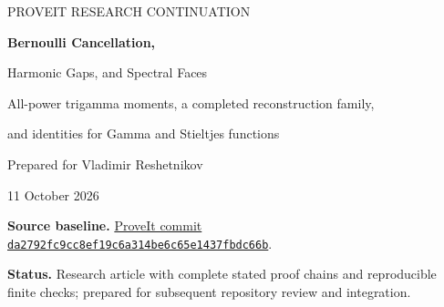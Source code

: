 \documentclass[11pt,a4paper]{article}
\begin{document}
\hypersetup{pageanchor=false}
\begin{titlepage}
\vspace*{15mm}
{\sffamily\color{ResearchBlue}\large PROVEIT RESEARCH CONTINUATION\par}
\vspace{12mm}
{\LARGE\bfseries Bernoulli Cancellation,\par
Harmonic Gaps, and Spectral Faces\par}
\vspace{7mm}
{\large All-power trigamma moments, a completed reconstruction family,\par
and identities for Gamma and Stieltjes functions\par}
\vspace{13mm}
{\large Prepared for Vladimir Reshetnikov\par}
\vspace{3mm}
{11 October 2026\par}
\vspace{13mm}
\begin{abstract}
We continue several precise research questions in the ProveIt manuscript
and its five incoming reports of 11 October 2026. A single Bernoulli
polynomial identity cancels the finite-cutoff boundary terms for every
power of the trigamma tail. It gives an anchored analytic generator,
a finite multiple-zeta coordinate space at each power, a uniform
extension to all repeated even-order Hurwitz tails, and explicit
fifth- and sixth-power ordinary convergent sums. We determine all Laurent
coefficients on the complementary resonant lattice, including the exact
local convergence radius and Stieltjes normalization. A separate exact
certificate at the previously uncovered index completes the
smaller-order-ten optimal-prefix reconstruction family. For relative
multiple-Hurwitz interpolants we prove closure under finite decorations
and obtain several-marker identities involving log-Gamma products and
normalized Stieltjes primitives. Finally, an explicit subtraction on
every face of a Dirichlet simplex expresses all higher spectral defects
through lower one-mass derivatives; the full zero-jet correction is a
finite rational function and vanishes for mean-zero periodic weights.
Proofs, exact algebraic certificates, numerical diagnostics, a source
audit, and precise further questions are supplied. Statements of rank
refer to specified rational coordinate systems; no numerical period
independence or unproved Gaussian ladder identity is asserted.
\end{abstract}
\vfill
\noindent\textbf{Source baseline.}
\href{https://github.com/VladimirReshetnikov/ProveIt/tree/da2792fc9cc8ef19c6a314be6c65e1437fbdc66b}{ProveIt commit
\texttt{da2792fc9cc8ef19c6a314be6c65e1437fbdc66b}}.\par
\smallskip
\noindent\textbf{Status.} Research article with complete stated proof
chains and reproducible finite checks; prepared for subsequent repository
review and integration.
\end{titlepage}
\end{document}
